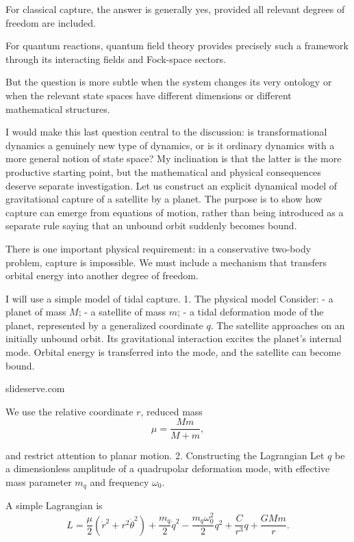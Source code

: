 For classical capture, the answer is generally yes, provided all relevant degrees of freedom are included.

For quantum reactions, quantum field theory provides precisely such a framework through its interacting fields and Fock-space sectors.

But the question is more subtle when the system changes its very ontology or when the relevant state spaces have different dimensions or different mathematical structures.

I would make this last question central to the discussion: is transformational dynamics a genuinely new type of dynamics, or is it ordinary dynamics with a more general notion of state space? My inclination is that the latter is the more productive starting point, but the mathematical and physical consequences deserve separate investigation.
Let us construct an explicit dynamical model of gravitational capture of a satellite by a planet. The purpose is to show how capture can emerge from equations of motion, rather than being introduced as a separate rule saying that an unbound orbit suddenly becomes bound.

There is one important physical requirement: in a conservative two-body problem, capture is impossible. We must include a mechanism that transfers orbital energy into another degree of freedom.

I will use a simple model of tidal capture.
1. The physical model
Consider:
- a planet of mass \(M\);
- a satellite of mass \(m\);
- a tidal deformation mode of the planet, represented by a generalized coordinate \(q\).
The satellite approaches on an initially unbound orbit. Its gravitational interaction excites the planet's internal mode. Orbital energy is transferred into the mode, and the satellite can become bound.








slideserve.com


We use the relative coordinate \(r\), reduced mass
\[
\mu=\frac{Mm}{M+m},
\]

and restrict attention to planar motion.
2. Constructing the Lagrangian
Let \(q\) be a dimensionless amplitude of a quadrupolar deformation mode, with effective mass parameter \(m_q\) and frequency \(\omega_0\).

A simple Lagrangian is
\[
\boxed{
L=
\frac{\mu}{2}(\dot r^2+r^2\dot\theta^2)
+\frac{m_q}{2}\dot q^2
-\frac{m_q\omega_0^2}{2}q^2
+\frac{C}{r^3}q
+\frac{GMm}{r}.
}
\]

